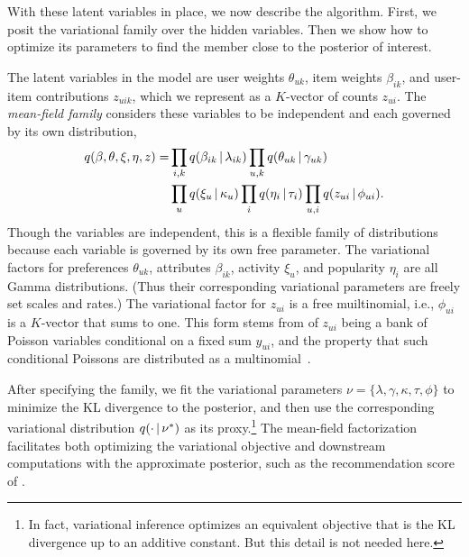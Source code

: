 With these latent variables in place, we now describe the algorithm.
First, we posit the variational family over the hidden variables.
Then we show how to optimize its parameters to find the member close
to the posterior of interest.

The latent variables in the model are user weights $\theta_{uk}$, item
weights $\beta_{ik}$, and user-item contributions $z_{uik}$, which we
represent as a $K$-vector of counts $z_{ui}$.  The \textit{mean-field
  family} considers these variables to be independent and each
governed by its own distribution,
\begin{align}
  \label{eq:q}
  q(\beta, \theta, \xi, \eta, z) =& \prod_{i,k} q(\beta_{ik} \,\vert\, \lambda_{ik})
  \prod_{u,k} q(\theta_{uk} \,\vert\, \gamma_{uk}) \nonumber\\
  & \prod_{u} q(\xi_u \,\vert\, \kappa_u) \prod_{i} q(\eta_i \,\vert\, \tau_i)
  \prod_{u,i} q(z_{ui} \,\vert\, \phi_{ui}).
\end{align}
Though the variables are independent, this is a flexible family of
distributions because each variable is governed by its own free
parameter.  The variational factors for preferences $\theta_{uk}$,
attributes $\beta_{ik}$, activity $\xi_u$, and popularity $\eta_i$ are
all Gamma distributions.  (Thus their corresponding variational
parameters are freely set scales and rates.)  The variational factor
for $z_{ui}$ is a free muiltinomial, i.e., $\phi_{ui}$ is a $K$-vector
that sums to one.  This form stems from of $z_{ui}$ being a bank of
Poisson variables conditional on a fixed sum $y_{ui}$, and the
property that such conditional Poissons are distributed as a
multinomial~\cite{Johnson:2005, Cemgil:2009}.



After specifying the family, we fit the variational parameters $\nu =
\{\lambda, \gamma, \kappa, \tau, \phi\}$ to minimize the KL divergence
to the posterior, and then use the corresponding variational
distribution $q(\cdot \,\vert\, \nu^*)$ as its proxy.\footnote{In fact,
  variational inference optimizes an equivalent objective that is the
  KL divergence up to an additive constant.  But this detail is not
  needed here.}  The mean-field factorization facilitates both
optimizing the variational objective and downstream computations with
the approximate posterior, such as the recommendation score of
.

